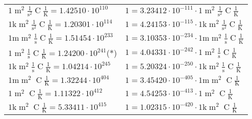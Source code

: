 \begin{center}
\begin{longtable}{l l}
{\color{black}$1 \bm{\mathrm{ }}{\operatorname{m}^2}\frac1{\operatorname{s}^2}{\operatorname{C}}\frac1{\operatorname{K}} = 1.42510\cdot10^{110} $}   & {\color{black}$ 1 = 3.23412\cdot10^{-111} \cdot 1 \bm{\mathrm{ }}{\operatorname{m}^2}\frac1{\operatorname{s}^2}{\operatorname{C}}\frac1{\operatorname{K}}$}  \\
{\color{gray}$1 \bm{\mathrm{ k}}{\operatorname{m}^2}\frac1{\operatorname{s}^2}{\operatorname{C}}\frac1{\operatorname{K}} = 1.20301\cdot10^{114} $}   & {\color{gray}$ 1 = 4.24153\cdot10^{-115} \cdot 1 \bm{\mathrm{ k}}{\operatorname{m}^2}\frac1{\operatorname{s}^2}{\operatorname{C}}\frac1{\operatorname{K}}$}  \\
{\color{gray}$1 \bm{\mathrm{ m}}{\operatorname{m}^2}\frac1{\operatorname{s}}{\operatorname{C}}\frac1{\operatorname{K}} = 1.51454\cdot10^{233} $}   & {\color{gray}$ 1 = 3.10353\cdot10^{-234} \cdot 1 \bm{\mathrm{ m}}{\operatorname{m}^2}\frac1{\operatorname{s}}{\operatorname{C}}\frac1{\operatorname{K}}$}  \\
{\color{black}$1 \bm{\mathrm{ }}{\operatorname{m}^2}\frac1{\operatorname{s}}{\operatorname{C}}\frac1{\operatorname{K}} = 1.24200\cdot10^{241} $}\quad(*) & {\color{black}$ 1 = 4.04331\cdot10^{-242} \cdot 1 \bm{\mathrm{ }}{\operatorname{m}^2}\frac1{\operatorname{s}}{\operatorname{C}}\frac1{\operatorname{K}}$}  \\
{\color{gray}$1 \bm{\mathrm{ k}}{\operatorname{m}^2}\frac1{\operatorname{s}}{\operatorname{C}}\frac1{\operatorname{K}} = 1.04214\cdot10^{245} $}   & {\color{gray}$ 1 = 5.20324\cdot10^{-250} \cdot 1 \bm{\mathrm{ k}}{\operatorname{m}^2}\frac1{\operatorname{s}}{\operatorname{C}}\frac1{\operatorname{K}}$}  \\
{\color{gray}$1 \bm{\mathrm{ m}}{\operatorname{m}^2}{}{\operatorname{C}}\frac1{\operatorname{K}} = 1.32244\cdot10^{404} $}   & {\color{gray}$ 1 = 3.45420\cdot10^{-405} \cdot 1 \bm{\mathrm{ m}}{\operatorname{m}^2}{}{\operatorname{C}}\frac1{\operatorname{K}}$}  \\
{\color{black}$1 \bm{\mathrm{ }}{\operatorname{m}^2}{}{\operatorname{C}}\frac1{\operatorname{K}} = 1.11322\cdot10^{412} $}   & {\color{black}$ 1 = 4.54253\cdot10^{-413} \cdot 1 \bm{\mathrm{ }}{\operatorname{m}^2}{}{\operatorname{C}}\frac1{\operatorname{K}}$}  \\
{\color{gray}$1 \bm{\mathrm{ k}}{\operatorname{m}^2}{}{\operatorname{C}}\frac1{\operatorname{K}} = 5.33411\cdot10^{415} $}   & {\color{gray}$ 1 = 1.02315\cdot10^{-420} \cdot 1 \bm{\mathrm{ k}}{\operatorname{m}^2}{}{\operatorname{C}}\frac1{\operatorname{K}}$}  \\

\end{longtable}
\end{center}
